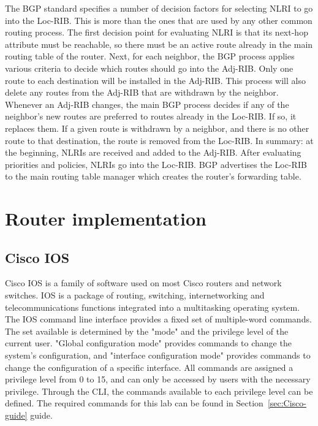 \documentclass[a4paper]{article}
\begin{document}
The BGP standard specifies a number of decision factors for selecting NLRI to go into the Loc-RIB. This is more than the ones that are used by any other common routing process. The first decision point for evaluating NLRI is that its next-hop attribute must be reachable, so there must be an active route already in the main routing table of the router. Next, for each neighbor, the BGP process applies various criteria to decide which routes should go into the Adj-RIB. Only one route to each destination will be installed in the Adj-RIB. This process will also delete any routes from the Adj-RIB that are withdrawn by the neighbor.
Whenever an Adj-RIB changes, the main BGP process decides if any of the neighbor's new routes are preferred to routes already in the Loc-RIB. If so, it replaces them. If a given route is withdrawn by a neighbor, and there is no other route to that destination, the route is removed from the Loc-RIB. 
In summary: at the beginning, NLRIs are received and added to the Adj-RIB. After evaluating priorities and policies, NLRIs go into the Loc-RIB. BGP advertises the Loc-RIB to the main routing table manager which creates the router's forwarding table.


\section{Router implementation}

\subsection{Cisco IOS}

Cisco IOS is a family of software used on most Cisco routers and network switches. IOS is a package of routing, switching, internetworking and telecommunications functions integrated into a multitasking operating system. The IOS command line interface provides a fixed set of multiple-word commands. The set available is determined by the "mode" and the privilege level of the current user. "Global configuration mode" provides commands to change the system's configuration, and "interface configuration mode" provides commands to change the configuration of a specific interface. All commands are assigned a privilege level from 0 to 15, and can only be accessed by users with the necessary privilege. Through the CLI, the commands available to each privilege level can be defined.
The required commands for this lab can be found in Section~\ref{sec:Cisco-guide} guide.
\end{document}
